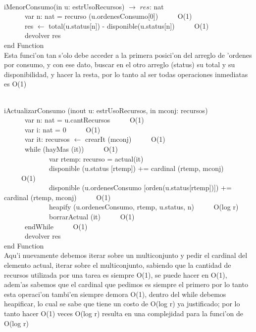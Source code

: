 \documentclass[a4paper,10pt]{article}
\begin{document}
\begin{algoritmo}
\caption{}\\
  iMenorConsumo(in u: estrUsoRecursos) $\rightarrow$ $res$: nat \\
	\indent \ \ \ \ \ \  var n: nat = recurso (u.ordenesConsumo[0])  \ \ \ \ \ O(1)\\
	\indent \ \ \ \ \ \  res $\gets$ total(u.status[n]) - disponible(u.status[n])   \ \ \ \ \ O(1)\\   
   	\indent \ \ \ \ \ \  devolver res    \\
   end Function \\

Esta funci'on tan s'olo debe acceder a la primera posici'on del arreglo de 'ordenes por consumo, y con ese dato, buscar en el otro arreglo (status) su total y su disponibilidad, y hacer la resta, por lo tanto al ser todas operaciones inmediatas es O(1)
\end{algoritmo}



\begin{algoritmo}
\caption{}\\
iActualizarConsumo (inout u: estrUsoRecursos, in mconj: recursos) \\
	\indent \ \ \ \ \ \  var n: nat = u.cantRecursos  \ \ \ \ \ O(1)\\
	\indent \ \ \ \ \ \  var i: nat = 0  \ \ \ \ \ O(1)\\  
	\indent \ \ \ \ \ \  var it: recursos $\gets$ crearIt (mconj)  \ \ \ \ \ O(1)\\  
	\indent \ \ \ \ \ \  while (hayMas (it))  \ \ \ \ \ O(1)\\
	\indent \ \ \ \ \ \ \ \ \ \ \ \ \ var rtemp: recurso = actual(it) \\	
	\indent \ \ \ \ \ \ \ \ \ \ \ \ \ disponible (u.status [rtemp]) += cardinal (rtemp, mconj) \ \ \ \ \ O(1) \\
	\indent \ \ \ \ \ \ \ \ \ \ \ \ \ disponible (u.ordenesConsumo [orden(u.status[rtemp])]) += cardinal (rtemp, mconj) \ \ \ \ \ O(1) \\
	\indent \ \ \ \ \ \ \ \ \ \ \ \ \ heapify (u.ordenesConsumo, rtemp, u.status, n) \ \ \ \ \ O(log r) \\
	\indent \ \ \ \ \ \ \ \ \ \ \ \ \ borrarActual (it) \ \ \ \ \ O(1) \\
	\indent \ \ \ \ \ \  endWhile \ \ \ \ \ O(1)\\ 
	\indent \ \ \ \ \ \  devolver res    \\
   end Function \\

Aqu'i nuevamente debemos iterar sobre un multiconjunto y pedir el cardinal del elemento actual, iterar sobre el multiconjunto, sabiendo que la cantidad de recursos utilizada por una tarea es siempre O(1), se puede hacer en O(1), adem'as sabemos que el cardinal que pedimos es siempre el primero por lo tanto esta operaci'on tambi'en siempre demora O(1), dentro del while debemos heapificar, lo cual se sabe que tiene un costo de O(log r) ya justificado; por lo tanto hacer O(1) veces O(log r) resulta en una complejidad para la funci'on de O(log r)
\end{algoritmo}
\end{document}
